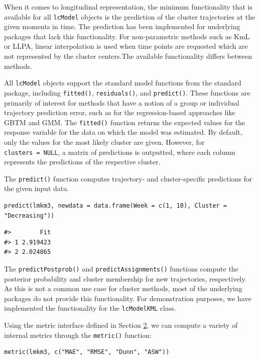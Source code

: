 When it comes to longitudinal representation, the minimum functionality that is available for all \texttt{lcModel} objects is the prediction of the cluster trajectories at the given moments in time. The prediction has been implemented for underlying packages that lack this functionality. For non-parametric methods such as KmL or LLPA, linear interpolation is used when time points are requested which are not represented by the cluster centers.The available functionality differs between methods.

All \texttt{lcModel} objects support the standard model functions from the standard  package, including \texttt{fitted()}, \texttt{residuals()}, and \texttt{predict()}. These functions are primarily of interest for methods that have a notion of a group or individual trajectory prediction error, such as for the regression-based approaches like GBTM and GMM. The \texttt{fitted()} function returns the expected values for the response variable for the data on which the model was estimated. By default, only the values for the most likely cluster are given. However, for \texttt{clusters\ =\ NULL}, a matrix of predictions is outputted, where each column represents the predictions of the respective cluster.

The \texttt{predict()} function computes trajectory- and cluster-specific predictions for the given input data.

\begin{verbatim}
predict(lmkm3, newdata = data.frame(Week = c(1, 10), Cluster = "Decreasing"))
\end{verbatim}

\begin{verbatim}
#>        Fit
#> 1 2.919423
#> 2 2.024865
\end{verbatim}

The \texttt{predictPostprob()} and \texttt{predictAssignments()} functions compute the posterior probability and cluster membership for new trajectories, respectively. As this is not a common use case for cluster methods, most of the underlying packages do not provide this functionality. For demonstration purposes, we have implemented the functionality for the \texttt{lcModelKML} class.

Using the metric interface defined in Section \hyperref[sec:methods]{2}, we can compute a variety of internal metrics through the \texttt{metric()} function:

\begin{verbatim}
metric(lmkm3, c("MAE", "RMSE", "Dunn", "ASW"))
\end{verbatim}

